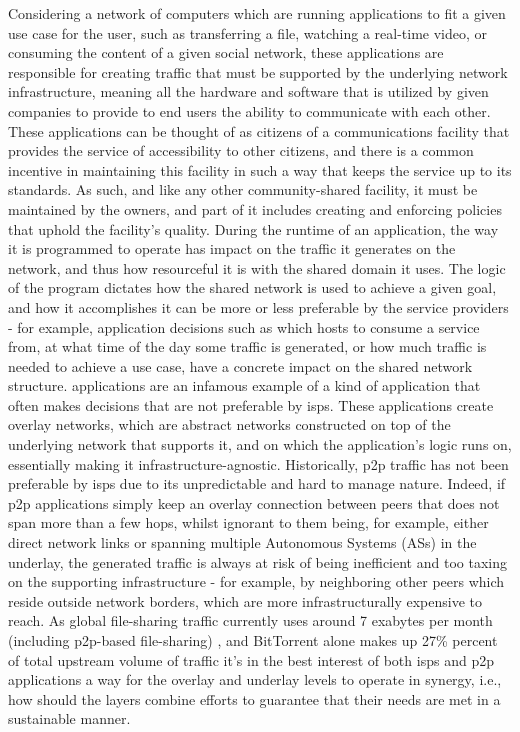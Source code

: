     Considering a network of computers which are running applications to fit a given use case for the user, such as transferring a file, watching a real-time video, or consuming the content of a given social network, these applications are responsible for creating traffic that must be supported by the underlying network infrastructure, meaning all the hardware and software that is utilized by given companies to provide to end users the ability to communicate with each other.
    These applications can be thought of as citizens of a communications facility that provides the service of accessibility to other citizens, and there is a common incentive in maintaining this facility in such a way that keeps the service up to its standards.
    As such, and like any other community-shared facility, it must be maintained by the owners, and part of it includes creating and enforcing policies that uphold the facility's quality.
    During the runtime of an application, the way it is programmed to operate has impact on the traffic it generates on the network, and thus how resourceful it is with the shared domain it uses.
    The logic of the program dictates how the shared network is used to achieve a given goal, and how it accomplishes it can be more or less preferable by the service providers - for example, application decisions such as which hosts to consume a service from, at what time of the day some traffic is generated, or how much traffic is needed to achieve a use case, have a concrete impact on the shared network structure.
     applications are an infamous example of a kind of application that often makes decisions that are not preferable by \glspl{isp}.
    These applications create overlay networks, which are abstract networks constructed on top of the underlying network that supports it, and on which the application's logic runs on, essentially making it infrastructure-agnostic.
    Historically, \gls{p2p} traffic has not been preferable by \glspl{isp} due to its unpredictable and hard to manage nature.
    Indeed, if \gls{p2p} applications simply keep an overlay connection between peers that does not span more than a few hops, whilst ignorant to them being, for example, either direct network links or spanning multiple Autonomous Systems (ASs) in the underlay, the generated traffic is always at risk of being inefficient and too taxing on the supporting infrastructure - for example, by neighboring other peers which reside outside network borders, which are more infrastructurally expensive to reach.
    As global file-sharing traffic currently uses around 7 exabytes per month (including \gls{p2p}-based file-sharing) \cite{cisco2019}, and BitTorrent alone makes up 27\% percent of total upstream volume of traffic \cite{sandvine2019} it's in the best interest of both \glspl{isp} and \gls{p2p} applications a way for the overlay and underlay levels to operate in synergy, i.e., how should the layers combine efforts to guarantee that their needs are met in a sustainable manner.

